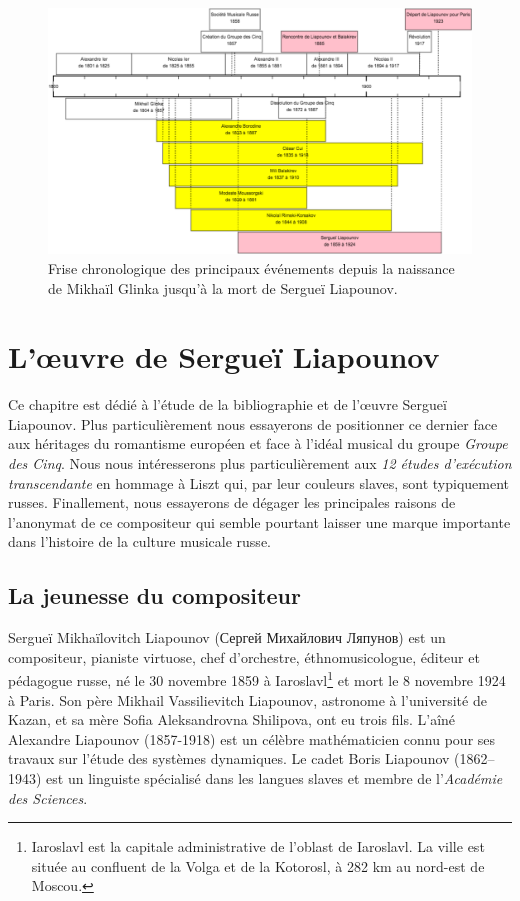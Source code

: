 \begin{figure}[!ht]
  \begin{bigcenter}
    \includegraphics[width=15.5cm, keepaspectratio]{frise.png}
  \end{bigcenter}
  \caption{\label{frise}Frise chronologique des principaux événements depuis la naissance de Mikhaïl Glinka jusqu'à la mort de Sergueï Liapounov.}
\end{figure}


\chapter{L'œuvre de Sergueï Liapounov}

Ce chapitre est dédié à l'étude de la bibliographie et de l'œuvre Sergueï Liapounov. Plus particulièrement nous essayerons de positionner ce dernier face aux héritages du romantisme européen et face à l'idéal musical du groupe \emph{Groupe des Cinq}. Nous nous intéresserons plus particulièrement aux \emph{12 études d'exécution transcendante} en hommage à Liszt qui, par leur couleurs slaves, sont typiquement russes. Finallement, nous essayerons de dégager les principales raisons de l'anonymat de ce compositeur qui semble pourtant laisser une marque importante dans l'histoire de la culture musicale russe.

\section{La jeunesse du compositeur}

Sergueï Mikhaïlovitch Liapounov (\foreignlanguage{russian}{Сергей Михайлович Ляпунов}) est un compositeur, pianiste virtuose, chef d'orchestre, éthnomusicologue, éditeur et pédagogue russe, né le 30 novembre 1859 à Iaroslavl\footnote{Iaroslavl est la capitale administrative de l'oblast de Iaroslavl. La ville est située au confluent de la Volga et de la Kotorosl, à 282 km au nord-est de Moscou.} et mort le 8 novembre 1924 à Paris. Son père Mikhail Vassilievitch Liapounov, astronome à l'université de Kazan, et sa mère Sofia Aleksandrovna Shilipova, ont eu trois fils. L'aîné Alexandre Liapounov (1857-1918) est un célèbre mathématicien connu pour ses travaux sur l'étude des systèmes dynamiques. Le cadet Boris Liapounov (1862–1943) est un linguiste spécialisé dans les langues slaves et membre de l'\emph{Académie des Sciences}.

